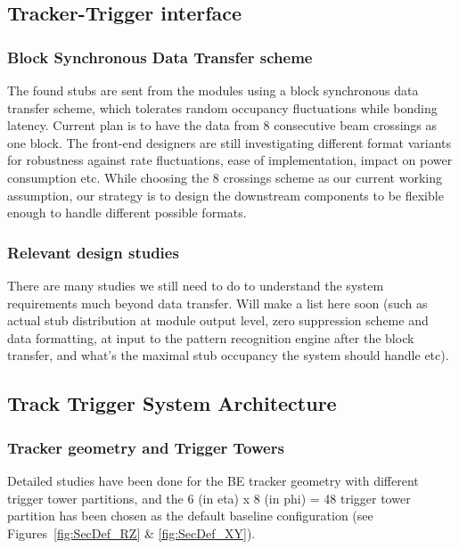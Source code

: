 \subsection{Tracker-Trigger interface}

\subsubsection{Block Synchronous Data Transfer scheme }

\noindent The found stubs are sent from the modules using a block synchronous data transfer scheme, which tolerates random occupancy fluctuations while bonding latency. Current plan is to have the data from 8 consecutive beam crossings as one block. The front-end designers are still investigating different format variants for robustness against rate fluctuations, ease of implementation, impact on power consumption etc. While choosing the 8 crossings scheme as our current working assumption, our strategy is to design the downstream components to be flexible enough to handle different possible formats.

\subsubsection{Relevant design studies}

\noindent There are many studies we still need to do to understand the system requirements much beyond data transfer. Will make a list here soon (such as actual stub distribution at module output level, zero suppression scheme and data formatting, at input to the pattern recognition engine after the block transfer, and what's the maximal stub occupancy the system should handle etc).

\subsection{Track Trigger System Architecture}

\subsubsection{Tracker geometry and Trigger Towers }

\noindent Detailed studies have been done for the BE tracker geometry with different trigger tower partitions, and the 6 (in eta) x 8 (in phi) = 48 trigger tower partition has been chosen as the default baseline configuration (see Figures~\ref{fig:SecDef_RZ} \& \ref{fig:SecDef_XY}).

